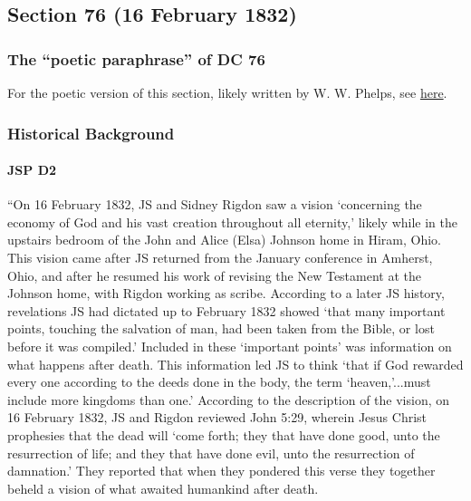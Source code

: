 \subsection{Section 76 (16 February 1832)}
	\label{DC76}
	
	\subsubsection{The ``poetic paraphrase'' of DC 76}
	
		For the poetic version of this section, likely written by W. W. Phelps, see \hyperref[EXSS-DC76-POETIC]{here}.
	
	\subsubsection{Historical Background}
		\label{DC76-HB}
		
		\paragraph{JSP D2}
		
			``On 16 February 1832, JS and Sidney Rigdon saw a vision `concerning the economy of God and his vast creation throughout all eternity,' likely while in the upstairs bedroom of the John and Alice (Elsa) Johnson home in Hiram, Ohio. This vision came after JS returned from the January conference in Amherst, Ohio, and after he resumed his work of revising the New Testament at the Johnson home, with Rigdon working as scribe. According to a later JS history, revelations JS had dictated up to February 1832 showed `that many important points, touching the salvation of man, had been taken from the Bible, or lost before it was compiled.' Included in these `important points' was information on what happens after death. This information led JS to think `that if God rewarded every one according to the deeds done in the body, the term `heaven,'...must include more kingdoms than one.' According to the description of the vision, on 16 February 1832, JS and Rigdon reviewed John 5:29, wherein Jesus Christ prophesies that the dead will `come forth; they that have done good, unto the resurrection of life; and they that have done evil, unto the resurrection of damnation.' They reported that when they pondered this verse they together beheld a vision of what awaited humankind after death.
			
